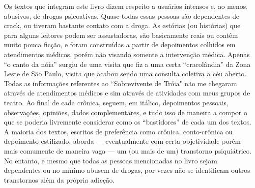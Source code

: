 Os textos que integram este livro dizem respeito a usuários intensos e, ao
menos, abusivos, de drogas psicoativas. Quase todas essas pessoas são
dependentes de crack, ou tiveram bastante contato com a droga.
As estórias (ou histórias) que para alguns leitores podem ser assustadoras,
são basicamente reais ou contêm muito pouca ficção, e foram construídas a
partir de depoimentos colhidos em atendimentos médicos, porém não visando
somente a intervenção médica.
Apenas ``o canto da nóia'' surgiu de uma visita que fiz a uma
certa “cracolândia” da Zona Leste de São Paulo, visita que acabou sendo uma
consulta coletiva a céu aberto.
Todas as informações referentes ao ``Sobrevivente de Tróia"
não me chegaram através de atendimentos médicos e sim através de atividades com
meus grupos de teatro.
Ao final de cada crônica, seguem, em itálico, depoimentos pessoais,
observações, opiniões, dados complementares, e tudo isso de maneira a compor o
que se poderia livremente considerar como os “bastidores” de cada um dos
textos.
A maioria dos textos, escritos de preferência como crônica, conto-crônica ou
depoimento estilizado, aborda — eventualmente com certa objetividade porém mais
comumente de maneira vaga — um (ou mais de um) transtorno psiquiátrico.
No entanto, e mesmo que todas as pessoas mencionadas no livro sejam dependentes
ou no mínimo abusem de drogas, por vezes não se identificam outros transtornos
além da própria adicção.\par
